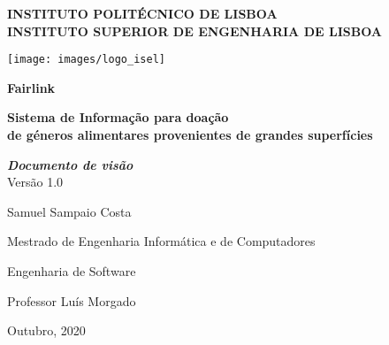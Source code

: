
\begin{titlepage}
	\begin{center}
		
		\Large\textbf{INSTITUTO POLITÉCNICO DE LISBOA}\\
		\Large\textbf{INSTITUTO SUPERIOR DE ENGENHARIA DE LISBOA}\\

		\vspace{15mm}
		
		\texttt{[image: images/logo\_isel]}\\[1cm]
		
		\vspace{10mm}
		
		\textbf{Fairlink}
	
		\vspace{5mm}
		
		\textbf{\normalsize Sistema de Informação para doação \\ de géneros alimentares provenientes de grandes superfícies }
		
		\vspace{15mm}
		
		\textit{\textbf{Documento de visão}}
		{{\small \\ Versão 1.0\\}}
		
		\vspace{10mm}
		
		{{\small Samuel Sampaio Costa\\
	
		\vspace{20mm}
		
		\small Mestrado de Engenharia Informática e de Computadores\\
		
		\vspace{5mm}
		
		Engenharia de Software\\
		
		\vspace{30mm}
		
		Professor Luís Morgado}}
		
		\vspace{30mm}
		
		Outubro, 2020
	\end{center}
\end{titlepage}